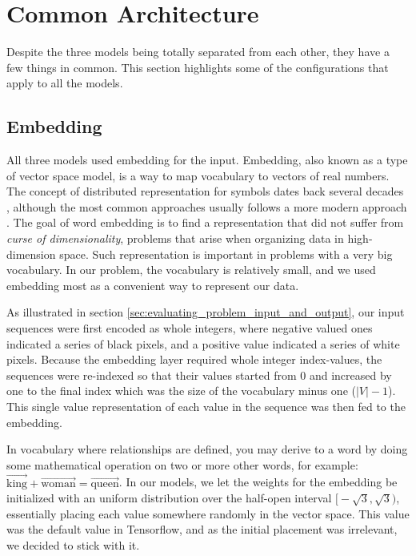 \section{Common Architecture}
Despite the three models being totally separated from each other, they have a few things in common. This section highlights some of the configurations that apply to all the models.

\subsection{Embedding}
All three models used embedding for the input. Embedding, also known as a type of vector space model, is a way to map vocabulary to vectors of real numbers. The concept of distributed representation for symbols dates back several decades \citep{hinton1986learning}, although the most common approaches usually follows a more modern approach \citep{bengio2003neural}. The goal of word embedding is to find a representation that did not suffer from \emph{curse of dimensionality}, problems that arise when organizing data in high-dimension space. Such representation is important in problems with a very big vocabulary. In our problem, the vocabulary is relatively small, and we used embedding most as a convenient way to represent our data.

As illustrated in section \ref{sec:evaluating_problem_input_and_output}, our input sequences were first encoded as whole integers, where negative valued ones indicated a series of black pixels, and a positive value indicated a series of white pixels. Because the embedding layer required whole integer index-values, the sequences were re-indexed so that their values started from \(0\) and increased by one to the final index which was the size of the vocabulary minus one (\(|V| - 1\)). This single value representation of each value in the sequence was then fed to the embedding. 

In vocabulary where relationships are defined, you may derive to a word by doing some mathematical operation on two or more other words, for example:  \(\vec{\text{king}}+\vec{\text{woman}}=\vec{\text{queen}}\). In our models, we let the weights for the embedding be initialized with an uniform distribution over the half-open interval \(\big[-\sqrt{3}, \sqrt{3}\big)\), essentially placing each value somewhere randomly in the vector space. This value was the default value in Tensorflow, and as the initial placement was irrelevant, we decided to stick with it.

